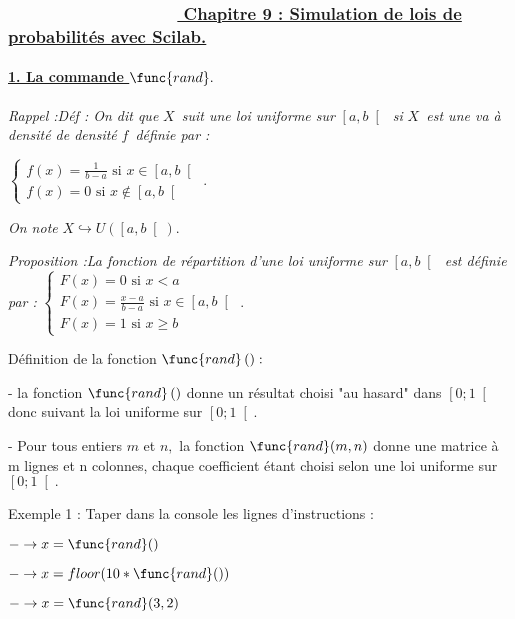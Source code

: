 \documentclass{article}
\begin{document}
\subsubsection{ \ \ \ \ \ \ \ \ \ \ \ \ \ \ \ \ \ \ \protect\underline{%
Chapitre 9 : Simulation de lois de probabilit\'{e}s avec Scilab.}}

\paragraph{\protect\underline{1. La commande $\func{rand}.$}}

\textit{Rappel :D\'{e}f : On dit que }$X$\textit{\ suit une loi uniforme sur 
}$\left[ a,b\right[ $\textit{\ si }$X$\textit{\ est une va \`{a} densit\'{e}
de densit\'{e} }$f$\textit{\ d\'{e}finie par :}

$\left\{ 
\begin{array}{c}
f(x)=\frac{1}{b-a}\text{ si }x\in \left[ a,b\right[ \\ 
f(x)=0\text{ si }x\notin \left[ a,b\right[%
\end{array}%
\right. \mathit{.}$

\textit{On note }$X\hookrightarrow U(\left[ a,b\right[ ).$

\textit{Proposition :La fonction de r\'{e}partition d'une loi uniforme sur }$%
\left[ a,b\right[ $\textit{\ est d\'{e}finie par : }$\left\{ 
\begin{array}{c}
F(x)=0\text{ si }x<a \\ 
F(x)=\frac{x-a}{b-a}\text{ si }x\in \left[ a,b\right[ \\ 
F(x)=1\text{ si }x\geq b%
\end{array}%
\right. .$

D\'{e}finition de la fonction $\func{rand}\left( {}\right) :$

- la fonction $\func{rand}\left( {}\right) $ donne un r\'{e}sultat choisi
"au hasard" dans $\left[ 0;1\right[ $ donc suivant la loi uniforme sur $%
\left[ 0;1\right[ .$

- Pour tous entiers $m$ et $n,$ la fonction $\func{rand}(m,n)$ donne une
matrice \`{a} m lignes et n colonnes, chaque coefficient \'{e}tant choisi
selon une loi uniforme sur $\left[ 0;1\right[ .$

Exemple 1 : Taper dans la console les lignes d'instructions :

$-\rightarrow x=\func{rand}()$

$-\rightarrow x=floor(10\ast \func{rand}())$

$-\rightarrow x=\func{rand}(3,2)$
\end{document}
